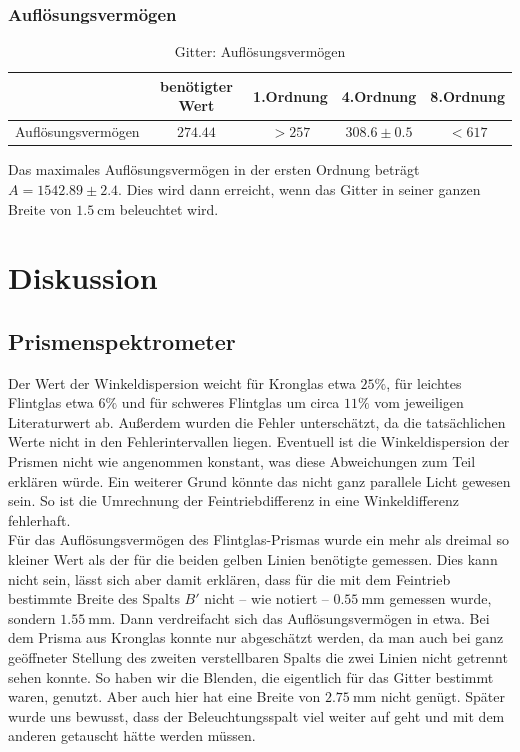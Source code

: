 \documentclass[12pt,a4paper,titlepage,headinclude,bibtotoc]{scrartcl}
\begin{document}
\subsubsection{Auflösungsvermögen}
\begin{table}[!htb]
	\centering
	\begin{tabular}{|c|c|c|c|c|}
		\hline
		& benötigter Wert &1.Ordnung &  4.Ordnung & 8.Ordnung \\
		\hline
	    Auflösungsvermögen & $274.44$ & $>257$ & $308.6 \pm 0.5$ & $<617$ \\
		\hline
	\end{tabular}
	\caption{Gitter: Auflösungsvermögen}
	\label{tab:gitterA}
\end{table}
Das maximales Auflösungsvermögen in der ersten Ordnung beträgt $A=1542.89 \pm 2.4$.
Dies wird dann erreicht, wenn das Gitter in seiner ganzen Breite von $1.5~$cm beleuchtet wird.

\section{Diskussion}
\label{sec:diskussion}
\subsection{Prismenspektrometer}
Der Wert der Winkeldispersion weicht für Kronglas etwa $25\%$, für leichtes Flintglas etwa $6\%$ und für schweres Flintglas  um circa $11\%$ vom jeweiligen Literaturwert ab.
Außerdem wurden die Fehler unterschätzt, da die tatsächlichen Werte nicht in den Fehlerintervallen liegen.
Eventuell ist die Winkeldispersion der Prismen nicht wie angenommen konstant, was diese Abweichungen zum Teil erklären würde.
Ein weiterer Grund könnte das nicht ganz parallele Licht gewesen sein.
So ist die Umrechnung der Feintriebdifferenz in eine Winkeldifferenz fehlerhaft.\\

Für das Auflösungsvermögen des Flintglas-Prismas wurde ein mehr als dreimal so kleiner Wert als der für die beiden gelben Linien benötigte gemessen.
Dies kann nicht sein, lässt sich aber damit erklären, dass für die mit dem Feintrieb bestimmte Breite des Spalts $B'$ nicht -- wie notiert -- $0.55~$mm gemessen wurde, sondern $1.55~$mm.
Dann verdreifacht sich das Auflösungsvermögen in etwa.
Bei dem Prisma aus Kronglas konnte nur abgeschätzt werden, da man auch bei ganz geöffneter Stellung des zweiten verstellbaren Spalts die zwei Linien nicht getrennt sehen konnte.
So haben wir die Blenden, die eigentlich für das Gitter bestimmt waren, genutzt.
Aber auch hier hat eine Breite von $2.75~$mm nicht genügt.
Später wurde uns bewusst, dass der Beleuchtungsspalt viel weiter auf geht und mit dem anderen getauscht hätte werden müssen.\\
\end{document}
